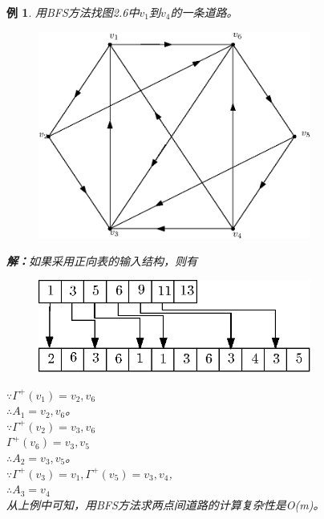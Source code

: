 \documentclass[11pt,a4paper,openany]{book}
\newtheorem{sample}{\textbf{例}}[section]
\begin{document}
\begin{sample}
用BFS方法找图2.6中$v_1$到$v_4$的一条道路。\\
\begin{figure}[!ht]
  \centering
  \includegraphics[width=0.8\textwidth]{2_6.eps}\\
  \caption{}\label{fig:2.6}
\end{figure}
\textbf{解：}如果采用正向表的输入结构，则有\\
\begin{figure}[h]
  \centering
   \vspace{-10pt}
  \includegraphics[width=0.8\textwidth]{2_6BFS.eps}\\
  \caption*{}\label{} \vspace{-40pt}
\end{figure}
$\because \Gamma^{+}(v_1)={v_2,v_6}$\\
$\therefore A_1={v_2,v_6}$。\\
$\because \Gamma^{+}(v_2)={v_3,v_6}$\\
$\Gamma^{+}(v_6)={v_3,v_5}$\\
$\therefore A_2={v_3,v_5}$。\\
$\because  \Gamma^{+}(v_3)={v_1},\Gamma^{+}(v_5)={v_3,v_4}$,\\
$\therefore A_3={v_4}$\\
\indent 从上例中可知，用BFS方法求两点间道路的计算复杂性是O(m)。
\end{sample}
\end{document}
